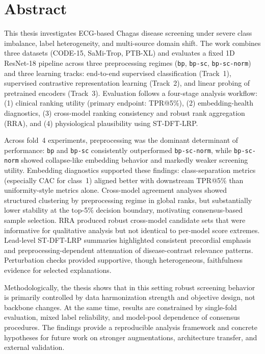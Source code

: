 \documentclass[
  12pt,
  twoside,
  paper=a4,
  DIV=15,
  BCOR=12mm,
  abstract=true,
  headsepline,
  headings=normal
]{scrreprt}
\begin{document}


\clearpage
\pagestyle{scrheadings}

\chapter*{Abstract}
This thesis investigates ECG-based Chagas disease screening under severe class imbalance, label heterogeneity, and multi-source domain shift.
The work combines three datasets (CODE-15, SaMi-Trop, PTB-XL) and evaluates a fixed 1D ResNet-18 pipeline across three preprocessing regimes (\texttt{bp}, \texttt{bp-sc}, \texttt{bp-sc-norm}) and three learning tracks: end-to-end supervised classification (Track~1), supervised contrastive representation learning (Track~2), and linear probing of pretrained encoders (Track~3).
Evaluation follows a four-stage analysis workflow: (1) clinical ranking utility (primary endpoint: TPR@5\%), (2) embedding-health diagnostics, (3) cross-model ranking consistency and robust rank aggregation (RRA), and (4) physiological plausibility using ST-DFT-LRP.

Across fold~4 experiments, preprocessing was the dominant determinant of performance: \texttt{bp} and \texttt{bp-sc} consistently outperformed \texttt{bp-sc-norm}, while \texttt{bp-sc-norm} showed collapse-like embedding behavior and markedly weaker screening utility.
Embedding diagnostics supported these findings: class-separation metrics (especially CAC for class~1) aligned better with downstream TPR@5\% than uniformity-style metrics alone.
Cross-model agreement analyses showed structured clustering by preprocessing regime in global ranks, but substantially lower stability at the top-5\% decision boundary, motivating consensus-based sample selection.
RRA produced robust cross-model candidate sets that were informative for qualitative analysis but not identical to per-model score extremes.
Lead-level ST-DFT-LRP summaries highlighted consistent precordial emphasis and preprocessing-dependent attenuation of disease-contrast relevance patterns.
Perturbation checks provided supportive, though heterogeneous, faithfulness evidence for selected explanations.

Methodologically, the thesis shows that in this setting robust screening behavior is primarily controlled by data harmonization strength and objective design, not backbone changes. At the same time, results are constrained by single-fold evaluation, mixed label reliability, and model-pool dependence of consensus procedures. The findings provide a reproducible analysis framework and concrete hypotheses for future work on stronger augmentations, architecture transfer, and external validation.
\cleardoublepage

\tableofcontents







\appendix


\clearpage
\printbibliography
\end{document}

